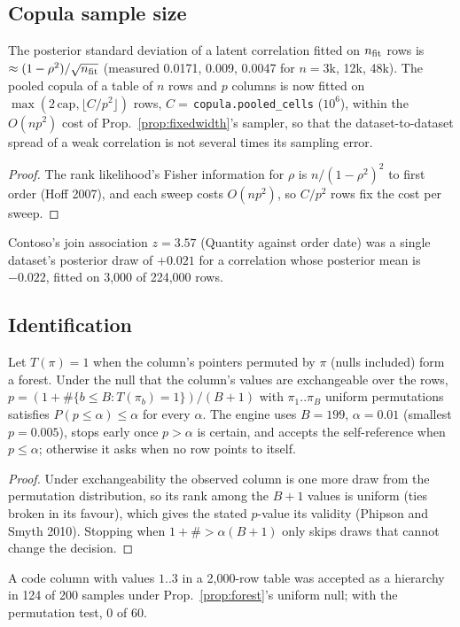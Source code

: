 \subsection{Copula sample size}
\begin{proposition}\label{prop:pooledcells}
The posterior standard deviation of a latent correlation fitted on $n_{\rm fit}$ rows is $\approx(1-\rho^2)/\sqrt{n_{\rm fit}}$ (measured 0.0171, 0.009, 0.0047 for $n=3$k, 12k, 48k). The pooled copula of a table of $n$ rows and $p$ columns is now fitted on $\max(2\,\mathrm{cap},\lfloor C/p^2\rfloor)$ rows, $C=$\,\texttt{copula.pooled\_cells} ($10^6$), within the $O(np^2)$ cost of Prop.~\ref{prop:fixedwidth}'s sampler, so that the dataset-to-dataset spread of a weak correlation is not several times its sampling error.
\end{proposition}
\begin{proof}
The rank likelihood's Fisher information for $\rho$ is $n/(1-\rho^2)^2$ to first order (Hoff 2007), and each sweep costs $O(np^2)$, so $C/p^2$ rows fix the cost per sweep.
\end{proof}
\noindent Contoso's join association $z=3.57$ (Quantity against order date) was a single dataset's posterior draw of $+0.021$ for a correlation whose posterior mean is $-0.022$, fitted on 3{,}000 of 224{,}000 rows.

\subsection{Identification}
\begin{proposition}\label{prop:forestperm}
Let $T(\pi)=1$ when the column's pointers permuted by $\pi$ (nulls included) form a forest. Under the null that the column's values are exchangeable over the rows, $p=(1+\#\{b\le B:T(\pi_b)=1\})/(B+1)$ with $\pi_1..\pi_B$ uniform permutations satisfies $P(p\le\alpha)\le\alpha$ for every $\alpha$. The engine uses $B=199$, $\alpha=0.01$ (smallest $p=0.005$), stops early once $p>\alpha$ is certain, and accepts the self-reference when $p\le\alpha$; otherwise it asks when no row points to itself.
\end{proposition}
\begin{proof}
Under exchangeability the observed column is one more draw from the permutation distribution, so its rank among the $B+1$ values is uniform (ties broken in its favour), which gives the stated $p$-value its validity (Phipson and Smyth 2010). Stopping when $1+\#>\alpha(B+1)$ only skips draws that cannot change the decision.
\end{proof}
\noindent A code column with values $1..3$ in a 2{,}000-row table was accepted as a hierarchy in 124 of 200 samples under Prop.~\ref{prop:forest}'s uniform null; with the permutation test, 0 of 60.

